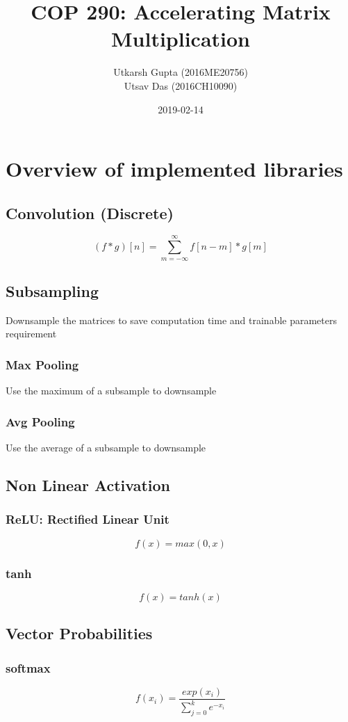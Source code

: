 \documentclass{article}
\title{COP 290: Accelerating Matrix Multiplication}
\date{2019-02-14}
\author{Utkarsh Gupta (2016ME20756) \\ Utsav Das (2016CH10090)}
\begin{document}
\maketitle

\newpage
{}
    \section{Overview of implemented libraries}
        \subsection{Convolution (Discrete)}
            $$ (f * g)[n] = \sum_{m=-\infty}^{\infty} f[n - m] * g[m] $$

        \subsection{Subsampling}
            Downsample the matrices to save computation time and trainable parameters requirement
            \subsubsection{Max Pooling}
                Use the maximum of a subsample to downsample
            \subsubsection{Avg Pooling}
                Use the average of a subsample to downsample

        \subsection{Non Linear Activation}
            \subsubsection{ReLU: Rectified Linear Unit}
                $$ f(x) = max(0, x) $$
            \subsubsection{tanh}
                $$ f(x) = tanh(x) $$

        \subsection{Vector Probabilities}
            \subsubsection{softmax}
                $$ f(x_i) = \frac{exp(x_i)}{\sum_{j=0}^{k} e^{-x_i}} $$
\end{document}
